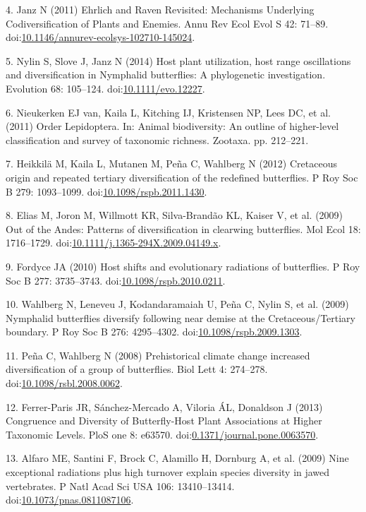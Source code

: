 \documentclass[]{article}
\begin{document}
4. Janz N (2011) Ehrlich and Raven Revisited: Mechanisms Underlying
Codiversification of Plants and Enemies. Annu Rev Ecol Evol S 42:
71--89.
doi:\href{http://dx.doi.org/10.1146/annurev-ecolsys-102710-145024}{10.1146/annurev-ecolsys-102710-145024}.

5. Nylin S, Slove J, Janz N (2014) Host plant utilization, host range
oscillations and diversification in Nymphalid butterflies: A
phylogenetic investigation. Evolution 68: 105--124.
doi:\href{http://dx.doi.org/10.1111/evo.12227}{10.1111/evo.12227}.

6. Nieukerken EJ van, Kaila L, Kitching IJ, Kristensen NP, Lees DC, et
al. (2011) Order Lepidoptera. In: Animal biodiversity: An outline of
higher-level classification and survey of taxonomic richness. Zootaxa.
pp. 212--221.

7. Heikkilä M, Kaila L, Mutanen M, Peña C, Wahlberg N (2012) Cretaceous
origin and repeated tertiary diversification of the redefined
butterflies. P Roy Soc B 279: 1093--1099.
doi:\href{http://dx.doi.org/10.1098/rspb.2011.1430}{10.1098/rspb.2011.1430}.

8. Elias M, Joron M, Willmott KR, Silva-Brandão KL, Kaiser V, et al.
(2009) Out of the Andes: Patterns of diversification in clearwing
butterflies. Mol Ecol 18: 1716--1729.
doi:\href{http://dx.doi.org/10.1111/j.1365-294X.2009.04149.x}{10.1111/j.1365-294X.2009.04149.x}.

9. Fordyce JA (2010) Host shifts and evolutionary radiations of
butterflies. P Roy Soc B 277: 3735--3743.
doi:\href{http://dx.doi.org/10.1098/rspb.2010.0211}{10.1098/rspb.2010.0211}.

10. Wahlberg N, Leneveu J, Kodandaramaiah U, Peña C, Nylin S, et al.
(2009) Nymphalid butterflies diversify following near demise at the
Cretaceous/Tertiary boundary. P Roy Soc B 276: 4295--4302.
doi:\href{http://dx.doi.org/10.1098/rspb.2009.1303}{10.1098/rspb.2009.1303}.

11. Peña C, Wahlberg N (2008) Prehistorical climate change increased
diversification of a group of butterflies. Biol Lett 4: 274--278.
doi:\href{http://dx.doi.org/10.1098/rsbl.2008.0062}{10.1098/rsbl.2008.0062}.

12. Ferrer-Paris JR, S{á}nchez-Mercado A, Viloria ÁL, Donaldson J (2013)
Congruence and Diversity of Butterfly-Host Plant Associations at Higher
Taxonomic Levels. PloS one 8: e63570.
doi:\href{http://dx.doi.org/0.1371/journal.pone.0063570}{0.1371/journal.pone.0063570}.

13. Alfaro ME, Santini F, Brock C, Alamillo H, Dornburg A, et al. (2009)
Nine exceptional radiations plus high turnover explain species diversity
in jawed vertebrates. P Natl Acad Sci USA 106: 13410--13414.
doi:\href{http://dx.doi.org/10.1073/pnas.0811087106}{10.1073/pnas.0811087106}.
\end{document}
